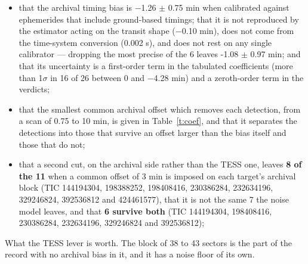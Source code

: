 \documentclass{aa}
\begin{document}
\begin{itemize}
\item that the archival timing bias is $-$1.26 $\pm$ 0.75 min when calibrated against ephemerides that include ground-based timings; that it is not reproduced by the estimator acting on the transit shape ($-$0.10 min), does not come from the time-system conversion (0.002 s), and does not rest on any single calibrator --- dropping the most precise of the 6 leaves -1.08 $\pm$ 0.97 min; and that its uncertainty is a first-order term in the tabulated coefficients (more than 1$\sigma$ in 16 of 26 between 0 and $-$4.28 min) and a zeroth-order term in the verdicts;
\item that the smallest common archival offset which removes each detection, from a scan of 0.75 to 10 min, is given in Table~\ref{t:coef}, and that it separates the detections into those that survive an offset larger than the bias itself and those that do not;
\item that a second cut, on the archival side rather than the TESS one, leaves \textbf{8 of the 11} when a common offset of 3 min is imposed on each target's archival block (TIC 144194304, 198388252, 198408416, 230386284, 232634196, 329246824, 392536812 and 424461577), that it is not the same 7 the noise model leaves, and that \textbf{6 survive both} (TIC 144194304, 198408416, 230386284, 232634196, 329246824 and 392536812);
\end{itemize}

What the TESS lever is worth. The block of 38 to 43 sectors is the part of the record with no archival bias in it, and it has a noise floor of its own.
\end{document}
